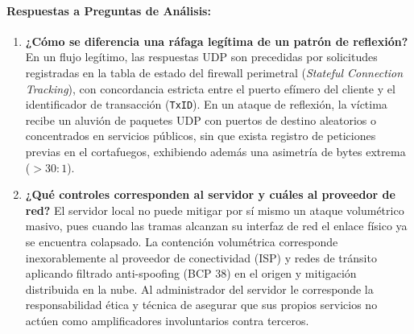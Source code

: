 \documentclass[11pt,letterpaper]{article}
\begin{document}
\paragraph{Respuestas a Preguntas de Análisis:}
\begin{enumerate}
    \item \textbf{¿Cómo se diferencia una ráfaga legítima de un patrón de reflexión?} En un flujo legítimo, las respuestas UDP son precedidas por solicitudes registradas en la tabla de estado del firewall perimetral (\textit{Stateful Connection Tracking}), con concordancia estricta entre el puerto efímero del cliente y el identificador de transacción (\texttt{TxID}). En un ataque de reflexión, la víctima recibe un aluvión de paquetes UDP con puertos de destino aleatorios o concentrados en servicios públicos, sin que exista registro de peticiones previas en el cortafuegos, exhibiendo además una asimetría de bytes extrema ($>30:1$).
    \item \textbf{¿Qué controles corresponden al servidor y cuáles al proveedor de red?} El servidor local no puede mitigar por sí mismo un ataque volumétrico masivo, pues cuando las tramas alcanzan su interfaz de red el enlace físico ya se encuentra colapsado. La contención volumétrica corresponde inexorablemente al proveedor de conectividad (ISP) y redes de tránsito aplicando filtrado anti-spoofing (BCP 38) en el origen y mitigación distribuida en la nube. Al administrador del servidor le corresponde la responsabilidad ética y técnica de asegurar que sus propios servicios no actúen como amplificadores involuntarios contra terceros.
\end{enumerate}
\end{document}
